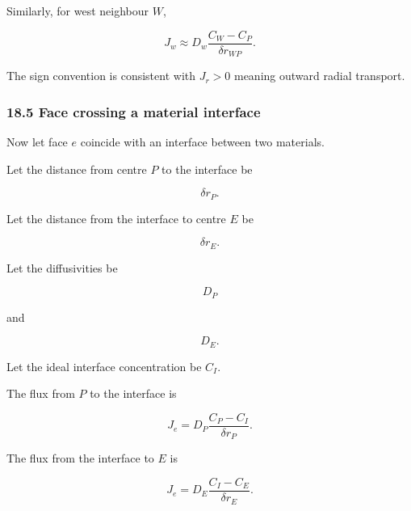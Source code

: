 \documentclass[11pt,a4paper]{article}
\begin{document}
Similarly, for west neighbour $W$,

\begin{equation}
\boxed{
J_w
\approx
D_w
\frac{C_W-C_P}{\delta r_{WP}}.
}
\tag{TRISO-FV-128}
\label{eq:triso-fv-128}
\end{equation}

The sign convention is consistent with $J_r>0$ meaning outward radial transport.

\subsubsection*{18.5 Face crossing a material interface}

Now let face $e$ coincide with an interface between two materials.

Let the distance from centre $P$ to the interface be

\begin{equation}
\delta r_P.
\tag{TRISO-FV-129}
\label{eq:triso-fv-129}
\end{equation}

Let the distance from the interface to centre $E$ be

\begin{equation}
\delta r_E.
\tag{TRISO-FV-130}
\label{eq:triso-fv-130}
\end{equation}

Let the diffusivities be

\begin{equation}
D_P
\tag{TRISO-FV-131}
\label{eq:triso-fv-131}
\end{equation}

and

\begin{equation}
D_E.
\tag{TRISO-FV-132}
\label{eq:triso-fv-132}
\end{equation}

Let the ideal interface concentration be $C_I$.

The flux from $P$ to the interface is

\begin{equation}
J_e
=
D_P
\frac{C_P-C_I}{\delta r_P}.
\tag{TRISO-FV-133}
\label{eq:triso-fv-133}
\end{equation}

The flux from the interface to $E$ is

\begin{equation}
J_e
=
D_E
\frac{C_I-C_E}{\delta r_E}.
\tag{TRISO-FV-134}
\label{eq:triso-fv-134}
\end{equation}
\end{document}
